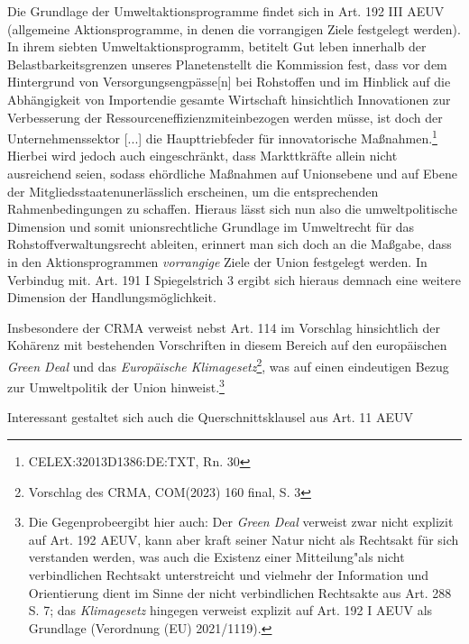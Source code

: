 \documentclass[12pt,a4paper,oneside]{book} %
\begin{document}
Die Grundlage der Umweltaktionsprogramme findet sich in Art. 192 III AEUV (\glqq allgemeine Aktionsprogramme, in denen die vorrangigen Ziele festgelegt werden\grqq).
In ihrem siebten Umweltaktionsprogramm, betitelt \glqq Gut leben innerhalb der Belastbarkeitsgrenzen unseres Planeten\grqq stellt die Kommission fest, dass vor dem Hintergrund von \glqq Versorgungsengpässe[n] bei Rohstoffen und im Hinblick auf die Abhängigkeit von Importen\grqq die gesamte Wirtschaft hinsichtlich \glqq Innovationen zur Verbesserung der Ressourceneffizienz\glqq miteinbezogen werden müsse, ist doch der \glqq Unternehmenssektor [...] die Haupttriebfeder für innovatorische Maßnahmen\grqq.\footnote{CELEX:32013D1386:DE:TXT, Rn. 30} Hierbei wird jedoch auch eingeschränkt, dass Markttkräfte allein nicht ausreichend seien, sodass \glqq [b]ehördliche Maßnahmen auf Unionsebene und auf Ebene der Mitgliedsstaaten\grqq unerlässlich erscheinen, um die entsprechenden Rahmenbedingungen zu schaffen. Hieraus lässt sich nun also die umweltpolitische Dimension und somit unionsrechtliche Grundlage im Umweltrecht für das Rohstoffverwaltungsrecht ableiten, erinnert man sich doch an die Maßgabe, dass in den Aktionsprogrammen \textit{vorrangige} Ziele der Union festgelegt werden. In Verbindug mit. Art. 191 I Spiegelstrich 3 ergibt sich hieraus demnach eine weitere Dimension der Handlungsmöglichkeit.
	
	
	
Insbesondere der CRMA verweist nebst Art. 114 im Vorschlag hinsichtlich der Kohärenz mit bestehenden Vorschriften in diesem Bereich auf den europäischen \textit{Green Deal} und das \textit{Europäische Klimagesetz}\footnote{Vorschlag des CRMA, COM(2023) 160 final, S. 3}, was auf einen eindeutigen Bezug zur Umweltpolitik der Union hinweist.\footnote{Die \glqq Gegenprobe\grqq ergibt hier auch: Der \textit{Green Deal} verweist zwar nicht explizit auf Art. 192 AEUV, kann aber kraft seiner Natur nicht als Rechtsakt für sich verstanden werden, was auch die Existenz einer \glqq Mitteilung"\grqq als nicht verbindlichen Rechtsakt unterstreicht und vielmehr der Information und Orientierung dient im Sinne der nicht verbindlichen Rechtsakte aus Art. 288 S. 7; das \textit{Klimagesetz} hingegen verweist explizit auf Art. 192 I AEUV als Grundlage (Verordnung (EU) 2021/1119).}
	
Interessant gestaltet sich auch die Querschnittsklausel aus Art. 11 AEUV
	
\end{document}
